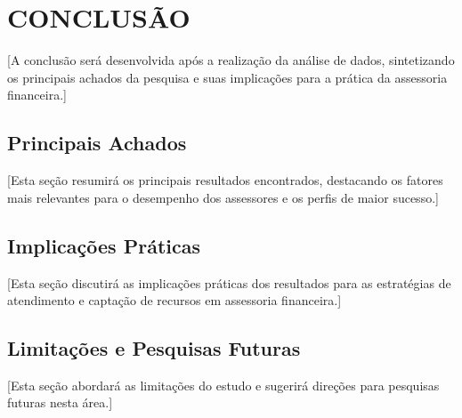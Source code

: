 \chapter{CONCLUSÃO}

[A conclusão será desenvolvida após a realização da análise de dados, sintetizando os principais achados da pesquisa e suas implicações para a prática da assessoria financeira.]

\section{Principais Achados}

[Esta seção resumirá os principais resultados encontrados, destacando os fatores mais relevantes para o desempenho dos assessores e os perfis de maior sucesso.]

\section{Implicações Práticas}

[Esta seção discutirá as implicações práticas dos resultados para as estratégias de atendimento e captação de recursos em assessoria financeira.]

\section{Limitações e Pesquisas Futuras}

[Esta seção abordará as limitações do estudo e sugerirá direções para pesquisas futuras nesta área.]